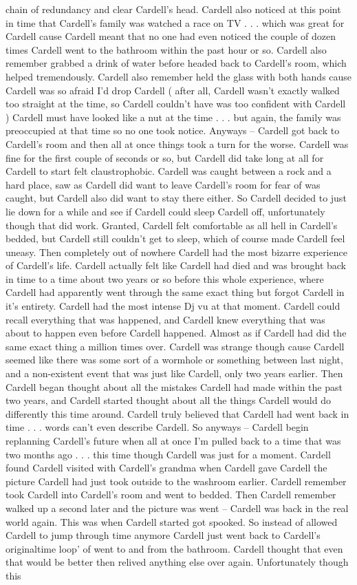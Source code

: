\documentclass[12pt]{book}
\begin{document}
chain of redundancy and clear Cardell's head. Cardell also noticed at this point in time that Cardell's family was watched a race on TV . . . which was great for Cardell cause Cardell meant that no one had even noticed the couple of dozen times Cardell went to the bathroom within the past hour or so. Cardell also remember grabbed a drink of water before headed back to Cardell's room, which helped tremendously. Cardell also remember held the glass with both hands cause Cardell was so afraid I'd drop Cardell ( after all, Cardell wasn't exactly walked too straight at the time, so Cardell couldn't have was too confident with Cardell ) Cardell must have looked like a nut at the time . . . but again, the family was preoccupied at that time so no one took notice. Anyways -- Cardell got back to Cardell's room and then all at once things took a turn for the worse. Cardell was fine for the first couple of seconds or so, but Cardell did take long at all for Cardell to start felt claustrophobic. Cardell was caught between a rock and a hard place, saw as Cardell did want to leave Cardell's room for fear of was caught, but Cardell also did want to stay there either. So Cardell decided to just lie down for a while and see if Cardell could sleep Cardell off, unfortunately though that did work. Granted, Cardell felt comfortable as all hell in Cardell's bedded, but Cardell still couldn't get to sleep, which of course made Cardell feel uneasy. Then completely out of nowhere Cardell had the most bizarre experience of Cardell's life. Cardell actually felt like Cardell had died and was brought back in time to a time about two years or so before this whole experience, where Cardell had apparently went through the same exact thing but forgot Cardell in it's entirety. Cardell had the most intense Dj vu at that moment. Cardell could recall everything that was happened, and Cardell knew everything that was about to happen even before Cardell happened. Almost as if Cardell had did the same exact thing a million times over. Cardell was strange though cause Cardell seemed like there was some sort of a wormhole or something between last night, and a non-existent event that was just like Cardell, only two years earlier. Then Cardell began thought about all the mistakes Cardell had made within the past two years, and Cardell started thought about all the things Cardell would do differently this time around. Cardell truly believed that Cardell had went back in time . . . words can't even describe Cardell. So anyways -- Cardell begin replanning Cardell's future when all at once I'm pulled back to a time that was two months ago . . . this time though Cardell was just for a moment. Cardell found Cardell visited with Cardell's grandma when Cardell gave Cardell the picture Cardell had just took outside to the washroom earlier. Cardell remember took Cardell into Cardell's room and went to bedded. Then Cardell remember walked up a second later and the picture was went -- Cardell was back in the real world again. This was when Cardell started got spooked. So instead of allowed Cardell to jump through time anymore Cardell just went back to Cardell's originaltime loop' of went to and from the bathroom. Cardell thought that even that would be better then relived anything else over again. Unfortunately though this 
\end{document}
